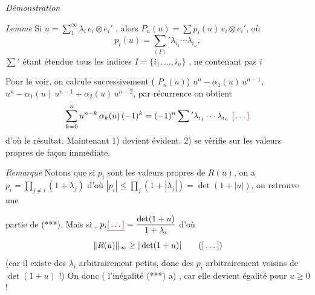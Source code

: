 \documentclass[11pt,a4paper]{article}
\begin{document}
\emph{Démonstration}  

\emph{Lemme} Si $u = \sum_1^\infty \lambda_i\, e_i \otimes e_i'$ , alors $P_n(u) = \sum p_i(u)\, e_i \otimes e_i'$, où
\[
  p_i(u) = \sum_{(I)}{}' \lambda_{i_1} \cdots \lambda_{i_n},
\]
$\sum'$ étant étendue  tous les \struck{\ill{}}   indices $I = \{i_1, \ldots, i_n\}$ , \struck{\ill{} \ill{}}  ne contenant pas $i$ 

Pour le voir, on calcule successivement (  \ill{} $P_n(u)$) \struck{\ill{}} $u^n - \alpha_1(u)\, u^{n-1}$, $u^n - \alpha_1(u)\, u^{n-1} + \alpha_2(u)\, u^{n-2}$, par récurrence on obtient
\[
  \sum_{k=0}^{n} u^{n-k}\, \alpha_k(u)\, (-1)^k = (-1)^n \sum{}' \lambda_{i_1} \cdots \lambda_{i_n} \ \ill{}
\]
d'où \struck{\ill{}} le résultat. Maintenant 1) devient évident. 2) se vérifie sur les valeurs propres de façon immédiate.

\emph{Remarque} Notons que si $p_i$ sont les valeurs propres de $R(u)$, on a $p_i = \prod_{j \neq i} (1 + \lambda_j)$ d'où $|p_i| \leq \prod_j (1 + |\lambda_j|) = \det(1 + |u|)$, on retrouve une


partie de (***). Mais si  \struck{\ill{}} \ill{} \ill{},   $p_i \struck{\ill{}} = \dfrac{\det(1+u)}{1 + \lambda_i}$ \uncertain{$\leq$} d'où
\[
  \|R(u)\|_\infty \geq |\det(1+u)| \qquad (\ill{})
\]
 (car il existe des $\lambda_i$ arbitrairement petits, donc des $p_i$ arbitrairement  voisins de $\det(1+u)$ !)  On \struck{\ill{}} \ill{} donc ( l'inégalité (***) a) \ill{}  , car elle devient égalité pour $u \geq 0$ !
\end{document}
